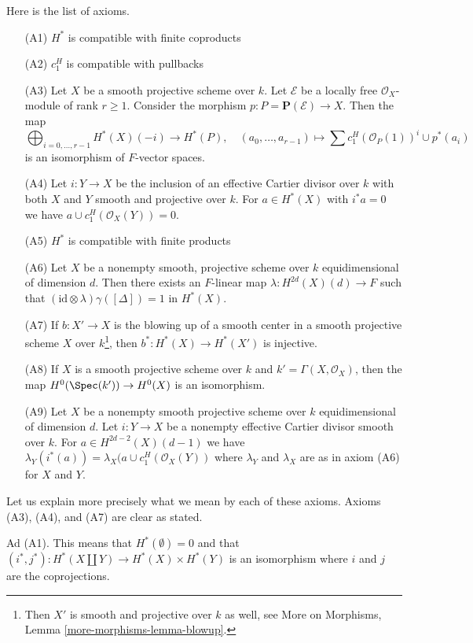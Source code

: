 \medskip\noindent
Here is the list of axioms.
\begin{enumerate}
\item[(A1)] $H^*$ is compatible with finite coproducts
\item[(A2)] $c_1^H$ is compatible with pullbacks
\item[(A3)] Let $X$ be a smooth projective scheme over $k$.
Let $\mathcal{E}$ be a locally free $\mathcal{O}_X$-module of rank $r \geq 1$.
Consider the morphism $p : P = \mathbf{P}(\mathcal{E}) \to X$.
Then the map
$$
\bigoplus\nolimits_{i = 0, \ldots, r - 1} H^*(X)(-i)
\longrightarrow H^*(P),\quad
(a_0, \ldots, a_{r - 1}) \longmapsto
\sum c_1^H(\mathcal{O}_P(1))^i \cup p^*(a_i)
$$
is an isomorphism of $F$-vector spaces.
\item[(A4)] Let $i : Y \to X$ be the inclusion of an effective
Cartier divisor over $k$ with both $X$ and $Y$ smooth and projective
over $k$. For $a \in H^*(X)$ with
$i^*a = 0$ we have $a \cup c_1^H(\mathcal{O}_X(Y)) = 0$.
\item[(A5)] $H^*$ is compatible with finite products
\item[(A6)] Let $X$ be a nonempty smooth, projective scheme over $k$
equidimensional of dimension $d$. Then there exists an
$F$-linear map $\lambda : H^{2d}(X)(d) \to F$ such that
$(\text{id} \otimes \lambda) \gamma([\Delta]) =  1$ in $H^*(X)$.
\item[(A7)] If $b : X' \to X$ is the blowing up of a smooth
center in a smooth projective scheme $X$ over $k$\footnote{Then $X'$ is
smooth and projective over $k$ as well, see
More on Morphisms, Lemma \ref{more-morphisms-lemma-blowup}.}, then
$b^* : H^*(X) \to H^*(X')$ is injective.
\item[(A8)] If $X$ is a smooth projective scheme over $k$ and
$k' = \Gamma(X, \mathcal{O}_X)$, then the map $H^0(\Spec(k')) \to H^0(X)$
is an isomorphism.
\item[(A9)] Let $X$ be a nonempty smooth projective scheme over $k$
equidimensional of dimension $d$. Let $i : Y \to X$ be a nonempty
effective Cartier divisor smooth over $k$. For $a \in H^{2d - 2}(X)(d - 1)$
we have $\lambda_Y(i^*(a)) = \lambda_X(a \cup c_1^H(\mathcal{O}_X(Y))$ where
$\lambda_Y$ and $\lambda_X$ are as in axiom (A6) for $X$ and $Y$.
\end{enumerate}
Let us explain more precisely what we mean by each of these axioms.
Axioms (A3), (A4), and (A7) are clear as stated.

\medskip\noindent
Ad (A1). This means that $H^*(\emptyset) = 0$ and that
$(i^*, j^*) : H^*(X \amalg Y) \to H^*(X) \times H^*(Y)$
is an isomorphism where $i$ and $j$ are the coprojections.

